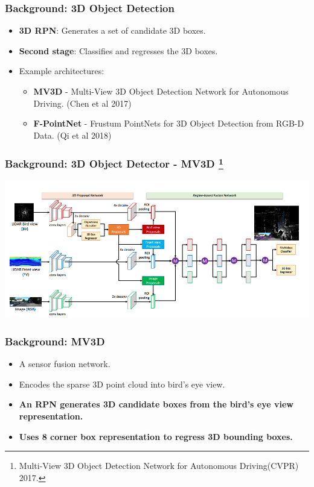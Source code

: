 \documentclass[10pt,fleqn,unknownkeysallowed]{beamer}
\begin{document}
\begin{frame}
	\frametitle{Background: 3D Object Detection}
	\linespread{1.5}
	\begin{itemize}
		\item{\textbf{3D RPN}: Generates a set of candidate 3D boxes.}
		\item{\textbf{Second stage}: Classifies and regresses the 3D boxes.}
		\item{Example architectures:}
		\begin{itemize}
			\item{\textbf{MV3D} - Multi-View 3D Object Detection Network for Autonomous Driving. (Chen et al 2017) \cite{mv3d}}
			\item{\textbf{F-PointNet} - Frustum PointNets for 3D Object Detection from RGB-D Data. (Qi et al 2018) \cite{frustumpointnet}}
		\end{itemize}
	\end{itemize}
\end{frame}

\begin{frame}
	\frametitle{Background: 3D Object Detector - MV3D \footnote{\tiny{ Multi-View 3D Object Detection Network for Autonomous Driving(CVPR) 2017.}}}
	\begin{center}
		\includegraphics[width=1.0\textwidth]{images/mv3d_arch}
	\end{center}
	
\end{frame}

\begin{frame}
	\frametitle{Background: MV3D}
	\linespread{1.5}
	\begin{itemize}
		\item{A sensor fusion network.}
		\item{Encodes the sparse 3D point cloud into bird's eye view.}
		\item{\textbf{An RPN generates 3D candidate boxes from the bird's eye view representation.}}
		\item{\textbf{Uses 8 corner box representation to regress 3D bounding boxes.}}
	\end{itemize}
\end{frame}
\end{document}
